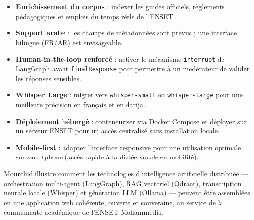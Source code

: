 \documentclass[11pt, a4paper]{article}
\begin{document}
\begin{itemize}
    \item \textbf{Enrichissement du corpus} : indexer les guides officiels, règlements pédagogiques et emplois du temps réels de l'ENSET.
    \item \textbf{Support arabe} : les champs de métadonnées sont prévus ; une interface bilingue (FR/AR) est envisageable.
    \item \textbf{Human-in-the-loop renforcé} : activer le mécanisme \texttt{interrupt} de LangGraph avant \texttt{finalResponse} pour permettre à un modérateur de valider les réponses sensibles.
    \item \textbf{Whisper Large} : migrer vers \texttt{whisper-small} ou \texttt{whisper-large} pour une meilleure précision en français et en darija.
    \item \textbf{Déploiement hébergé} : conteneuriser via Docker Compose et déployer sur un serveur ENSET pour un accès centralisé sans installation locale.
    \item \textbf{Mobile-first} : adapter l'interface responsive pour une utilisation optimale sur smartphone (accès rapide à la dictée vocale en mobilité).
\end{itemize}

\begin{citationbox}
Mourchid illustre comment les technologies d'intelligence artificielle distribuée --- orchestration multi-agent (LangGraph), RAG vectoriel (Qdrant), transcription neurale locale (Whisper) et génération LLM (Ollama) --- peuvent être assemblées en une application web cohérente, ouverte et souveraine, au service de la communauté académique de l'ENSET Mohammedia.
\end{citationbox}
\end{document}
